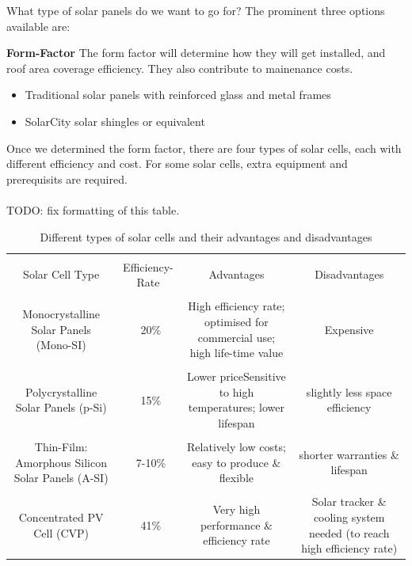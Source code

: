 \documentclass[10pt,letterpaper]{article}
\begin{document}
What type of solar panels do we want to go for? The prominent three options available are:

\textbf{Form-Factor}
The form factor will determine how they will get installed, and roof area coverage efficiency. They also contribute to mainenance costs.\\
\begin{itemize}
	\item Traditional solar panels with reinforced glass and metal frames
	\item SolarCity solar shingles or equivalent
\end{itemize}

Once we determined the form factor, there are four types of solar cells, each with different efficiency and cost. For some solar cells, extra equipment and prerequisits are required.\\
\\
TODO: fix formatting of this table.\\
\begin{table}[H]
	\begin{tabular}{ |c|c|c|c| }
		\hline\\
		Solar Cell Type & Efficiency-Rate &Advantages &Disadvantages\\

		\hline\\
		
		Monocrystalline Solar Panels (Mono-SI)&~20\%&High efficiency rate; optimised for commercial use; high life-time value &Expensive\\

		\hline\\
		
		Polycrystalline Solar Panels (p-Si)&~15\%&Lower priceSensitive to high temperatures; lower lifespan & slightly less space efficiency\\
		\hline\\
		
		Thin-Film: Amorphous Silicon Solar Panels (A-SI)&~7-10\%&Relatively low costs; easy to produce \& flexible&shorter warranties \& lifespan\\

		\hline\\

		Concentrated PV Cell (CVP)&~41\%&Very high performance \& efficiency rate&Solar tracker \& cooling system needed (to reach high efficiency rate)\\

		\hline
	\end{tabular}
	\caption{Different types of solar cells and their advantages and disadvantages\cite{solar-panel-types}}
\end{table}
\end{document}
